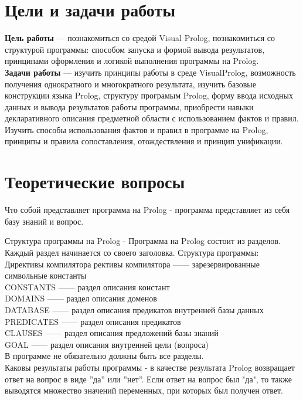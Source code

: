 \chapter{Цели и задачи работы}
\textbf{Цель работы} --- познакомиться со средой Visual Prolog, познакомиться со структурой программы: способом запуска и формой вывода результатов, принципами оформления и логикой выполнения программы на Prolog.\\
\textbf{Задачи работы} --- изучить принципы работы в среде VisualProlog, возможность получения однократного и многократного результата, изучить базовые конструкции языка Prolog, структуру програмым Prolog, форму ввода исходных данных и вывода результатов работы программы, приобрести навыки декларативного описания предметной области с использованием фактов и правил. Изучить способы использования фактов и правил в программе на Prolog, принципы и правила сопоставления, отождествления и принцип унификации.

\chapter{Теоретические вопросы}
Что собой представляет программа на Prolog - программа представляет из себя базу знаний и вопрос.

Структура программы на Prolog - Программа на Prolog состоит из разделов. Каждый раздел начинается со своего заголовка. Структура программы:\\
Директивы компилятора рективы компилятора —— зарезервированные символьные константы\\
CONSTANTS —— раздел описания констант\\
DOMAINS —— раздел описания доменов\\
DATABASE —— раздел описания предикатов внутренней базы данных\\
PREDICATES —— раздел описания предикатов\\
CLAUSES —— раздел описания предложений базы знаний\\
GOAL —— раздел описания внутренней цели (вопроса)\\
В программе не обязательно должны быть все разделы.\\

Каковы результаты работы программы - в качестве результата Prolog возвращает ответ на вопрос в виде ''да'' или ''нет''. Если ответ на вопрос был "да", то также выводятся множество значений переменных, при которых был получен ответ.\\

